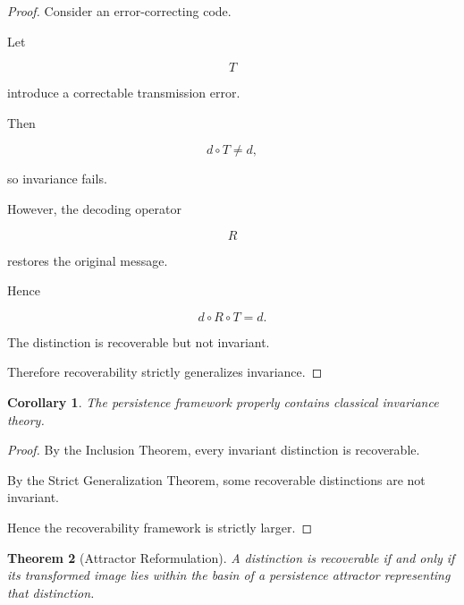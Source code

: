 \documentclass[12pt,oneside]{article}
\newtheorem{theorem}{Theorem}[section] \newtheorem{lemma}[theorem]{Lemma} \newtheorem{proposition}[theorem]{Proposition} \newtheorem{corollary}[theorem]{Corollary}
\theoremstyle{definition}
\begin{document}
\begin{proof}

Consider an error-correcting code.

Let

\[
T
\]

introduce a correctable transmission error.

Then

\[
d\circ T
\neq
d,
\]

so invariance fails.

However, the decoding operator

\[
R
\]

restores the original message.

Hence

\[
d\circ R\circ T
=
d.
\]

The distinction is recoverable but not invariant.

Therefore recoverability strictly generalizes invariance.

\end{proof}

\begin{corollary}

The persistence framework properly contains classical invariance theory.

\end{corollary}

\begin{proof}

By the Inclusion Theorem, every invariant distinction is recoverable.

By the Strict Generalization Theorem, some recoverable distinctions are not invariant.

Hence the recoverability framework is strictly larger.

\end{proof}

\begin{theorem}[Attractor Reformulation]

A distinction is recoverable if and only if its transformed image lies within the basin of a persistence attractor representing that distinction.

\end{theorem}
\end{document}
